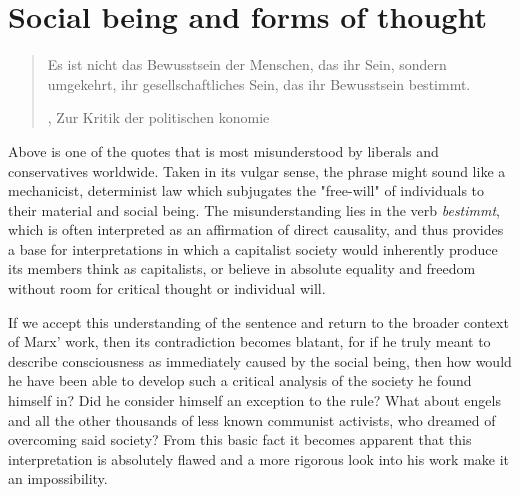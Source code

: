 
\section{Social being and forms of thought}

\begin{quote}
   Es ist nicht das Bewusstsein der Menschen, das ihr Sein, sondern umgekehrt, ihr gesellschaftliches Sein, das ihr Bewusstsein bestimmt. 
   \author{K. Marx},
   Zur Kritik der politischen konomie
\end{quote}

Above is one of the quotes that is most misunderstood by liberals and conservatives worldwide. Taken in its vulgar sense, the phrase might sound  
like a mechanicist, determinist law which subjugates the "free-will" of individuals to their material and social being. The misunderstanding lies in
the verb \textit{bestimmt}, which is often interpreted as an affirmation of direct causality, and thus provides a base for interpretations in which a capitalist society
would inherently produce its members think as capitalists, or believe in absolute equality and freedom without room for critical thought or individual will.

If we accept this understanding of the sentence and return to the broader context of Marx' work, then its contradiction becomes blatant, for if he truly meant 
to describe consciousness as immediately caused by the social being, then how would he have been able to develop
such a critical analysis of the society he found himself in? Did he consider himself an exception to the rule? What about engels and all the other thousands of less known communist activists, who dreamed of overcoming said society?
From this basic fact it becomes apparent that this interpretation is absolutely flawed and a more rigorous look into his work make it an impossibility.

